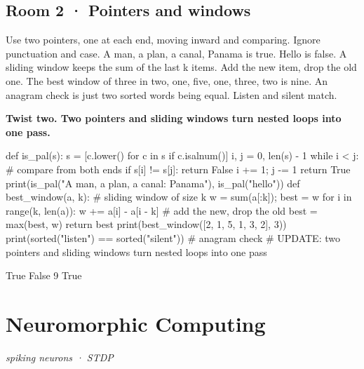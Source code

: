 \documentclass[11pt,a4paper]{report}
\begin{document}
\section*{Room 2 · Pointers and windows}
Use two pointers, one at each end, moving inward and comparing. Ignore punctuation and case. A man, a plan, a canal, Panama is true. Hello is false. A sliding window keeps the sum of the last k items. Add the new item, drop the old one. The best window of three in two, one, five, one, three, two is nine. An anagram check is just two sorted words being equal. Listen and silent match.
\begin{tcolorbox}[colback=yellow!12,colframe=orange!70!black,boxrule=0.4pt,left=4pt,right=4pt,top=2pt,bottom=2pt]\textbf{Twist two. Two pointers and sliding windows turn nested loops into one pass.}\end{tcolorbox}
\begin{Code}
def is_pal(s):
    s = [c.lower() for c in s if c.isalnum()]
    i, j = 0, len(s) - 1
    while i < j:                            # compare from both ends
        if s[i] != s[j]: return False
        i += 1; j -= 1
    return True
print(is_pal("A man, a plan, a canal: Panama"), is_pal("hello"))
def best_window(a, k):                      # sliding window of size k
    w = sum(a[:k]); best = w
    for i in range(k, len(a)):
        w += a[i] - a[i - k]                # add the new, drop the old
        best = max(best, w)
    return best
print(best_window([2, 1, 5, 1, 3, 2], 3))
print(sorted("listen") == sorted("silent"))     # anagram check
# UPDATE: two pointers and sliding windows turn nested loops into one pass
\end{Code}
\begin{Out}
True False
9
True
\end{Out}
\chapter{Neuromorphic Computing}
\textit{spiking neurons · STDP}
\end{document}

